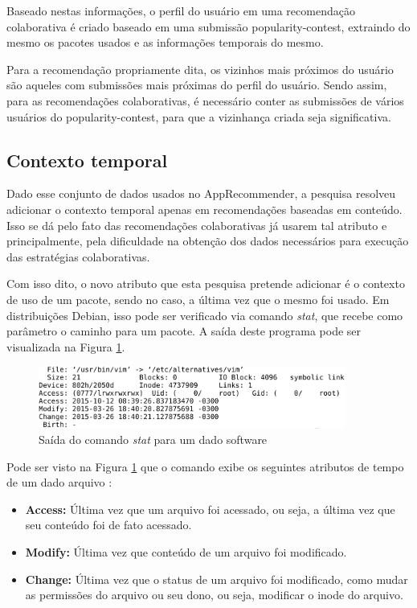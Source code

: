Baseado nestas informações, o perfil do usuário em uma recomendação colaborativa
é criado baseado em uma submissão popularity-contest, extraindo do mesmo os pacotes usados e
as informações temporais do mesmo.

Para a recomendação propriamente dita, os vizinhos mais próximos do usuário são
aqueles com submissões mais próximas do perfil do usuário. Sendo assim, para as
recomendações colaborativas, é necessário conter as submissões de vários
usuários do popularity-contest, para que a vizinhança criada seja significativa.

\subsection{Contexto temporal} \label{sec:contexto_temporal}

Dado esse conjunto de dados usados no AppRecommender, a pesquisa resolveu
adicionar o contexto temporal apenas em recomendações baseadas em conteúdo. Isso
se dá pelo fato das recomendações colaborativas já usarem tal atributo e
principalmente, pela dificuldade na obtenção dos dados necessários para execução
das estratégias colaborativas.

Com isso dito, o novo atributo que esta pesquisa pretende
adicionar é o contexto de uso de um pacote, sendo no caso, a última vez que o
mesmo foi usado. Em distribuições Debian, isso pode ser verificado via comando
\textit{stat}, que recebe como parâmetro o caminho para um pacote.
A saída deste programa pode ser visualizada na Figura \ref{fig:comando_stat}.

\begin{figure}[h]
  \centering
  \includegraphics[width=0.9\textwidth]{figuras/comando_stat.eps}
  \caption{Saída do comando \textit{stat} para um dado software}
  \label{fig:comando_stat}
\end{figure}

Pode ser visto na Figura \ref{fig:comando_stat} que o comando exibe os seguintes
atributos de tempo de um dado arquivo \cite{1_haas}:

\begin{itemize}
    \item \textbf{Access:} Última vez que um arquivo foi acessado, ou seja, a
        última vez que seu conteúdo foi de fato acessado.
    \item \textbf{Modify:} Última vez que conteúdo de um arquivo foi modificado.
    \item \textbf{Change:} Última vez que o status de um arquivo foi modificado,
        como mudar as permissões do arquivo ou seu dono, ou seja, modificar o
        inode do arquivo.
\end{itemize}

